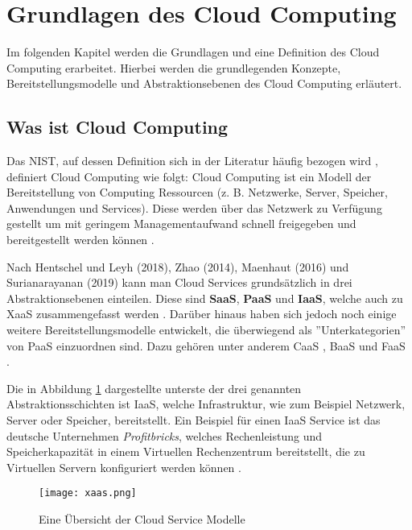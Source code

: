 \section{Grundlagen des Cloud Computing}
\label{sec:cloud-computing}

Im folgenden Kapitel werden die Grundlagen und eine Definition des Cloud Computing erarbeitet. Hierbei werden die grundlegenden Konzepte, Bereitstellungsmodelle und Abstraktionsebenen des Cloud Computing erläutert.

\subsection{Was ist Cloud Computing}
Das \ac{NIST}, auf dessen Definition sich in der Literatur häufig bezogen wird \cite[Vgl.][S. 4f]{Reinheimer2018}, definiert Cloud Computing wie folgt: Cloud Computing ist ein Modell der Bereitstellung von Computing Ressourcen (z. B. Netzwerke, Server, Speicher, Anwendungen und Services). Diese werden über das Netzwerk zu Verfügung gestellt um mit geringem Managementaufwand schnell freigegeben und bereitgestellt werden können \cite[Vgl.][S. 2]{Mell2011}\cite[Vgl.][S. 5]{Reinheimer2018}.

Nach Hentschel und Leyh (2018), Zhao (2014), Maenhaut (2016) und Surianarayanan (2019) kann man Cloud Services grundsätzlich in drei Abstraktionsebenen einteilen. Diese sind \textbf{\ac{SaaS}}, \textbf{\ac{PaaS}} und \textbf{\ac{IaaS}}, welche auch zu \ac{XaaS} zusammengefasst werden \cite[Vgl.][S. 9]{Reinheimer2018}\cite[Vgl.][S. 143f]{Zhao2014}\cite[Vgl.][S. 32ff]{Maenhaut2016}\cite[Vgl.][S. 226ff]{Surianarayanan2019}. Darüber hinaus haben sich jedoch noch einige weitere Bereitstellungsmodelle entwickelt, die überwiegend als ''Unterkategorien'' von \ac{PaaS} einzuordnen sind. Dazu gehören unter anderem \ac{CaaS} \cite[Vgl.][]{Luber2019}, \ac{BaaS} und \ac{FaaS} \cite[Vgl.][]{Luber2022}. \pagebreak

Die in Abbildung \ref{fig:XaaS} dargestellte unterste der drei genannten Abstraktionsschichten ist \ac{IaaS}, welche Infrastruktur, wie zum Beispiel Netzwerk, Server oder Speicher, bereitstellt. Ein Beispiel für einen \ac{IaaS} Service ist das deutsche Unternehmen \textit{Profitbricks}, welches Rechenleistung und Speicherkapazität in einem Virtuellen Rechenzentrum bereitstellt, die zu Virtuellen Servern konfiguriert werden können \cite[Vgl.][S. 12]{Reinheimer2018}.

\begin{figure}[H]
    \centering
    \texttt{[image: xaas.png]}
    \caption{Eine Übersicht der Cloud Service Modelle \cite[Eigene Darstellung nach][S. 33]{Maenhaut2016}\cite[Ergänzt durch][]{Toroman2018}}
    \label{fig:XaaS}
\end{figure}

